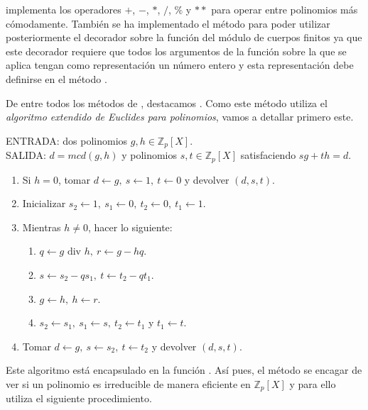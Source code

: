  implementa los operadores  $+$, $-$, $*$, $/$, $\%$ y $**$ para operar entre polinomios más cómodamente. También se ha implementado el método  para poder utilizar posteriormente el decorador  sobre la función  del módulo de cuerpos finitos ya que este decorador requiere que todos los argumentos de la función sobre la que se aplica tengan como representación un número entero y esta representación debe definirse en el método .

De entre todos los métodos de , destacamos . Como este método utiliza el \emph{algoritmo extendido de Euclides para polinomios}, vamos a detallar primero este.
\begin{algoritmo2}
\label{alg:algoritmo extendido de Euclides para polinomios}
    ENTRADA: dos polinomios $g, h \in \mathbb{Z}_p[X]$. \\
    SALIDA: $d = mcd(g, h)$ y polinomios $s, t \in \mathbb{Z}_p[X]$ satisfaciendo $s g + t h= d$.
    \begin{enumerate}
        \item Si $h = 0$, tomar $d \leftarrow g, \ s \leftarrow 1, \ t \leftarrow 0$ y devolver $(d, s, t)$.
        \item Inicializar $s_2 \leftarrow 1, \ s_1 \leftarrow 0, \ t_2 \leftarrow 0,\ t_1 \leftarrow 1$.
        \item Mientras $h \neq 0$, hacer lo siguiente:
        \begin{enumerate}
            \item $q \leftarrow g \textrm{ div } h, \ r \leftarrow g - h q$.
            \item $s \leftarrow s_2 - q s_1, \ t \leftarrow t_2 - q t_1$.
            \item $g \leftarrow h, \ h \leftarrow r$.
            \item $s_2 \leftarrow s_1, \ s_1 \leftarrow s, \ t_2 \leftarrow t_1$ y $t_1 \leftarrow t$.
        \end{enumerate}
        \item Tomar $d \leftarrow g, \ s \leftarrow s_2, \ t \leftarrow t_2$ y devolver $(d, s, t)$.
    \end{enumerate}
\end{algoritmo2}
Este algoritmo está encapsulado en la función . Así pues, el método  se encagar de ver si un polinomio es irreducible de manera eficiente en $\mathbb{Z}_p[X]$ y para ello utiliza el siguiente procedimiento.
